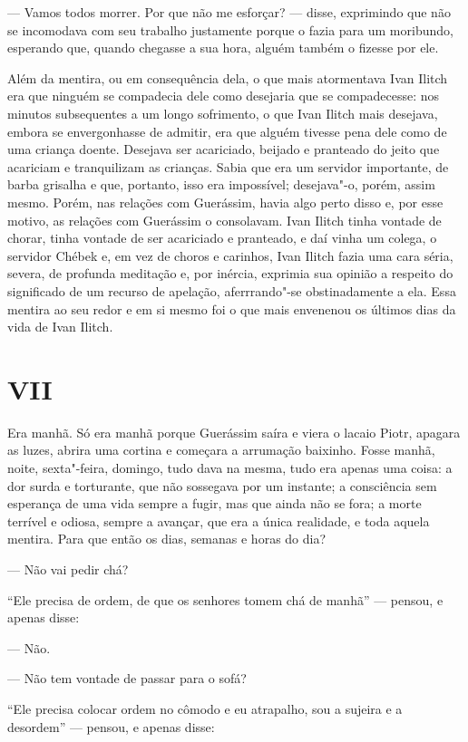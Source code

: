 --- Vamos todos morrer. Por que não me esforçar? --- disse, exprimindo que
não se incomodava com seu trabalho justamente porque o fazia para um
moribundo, esperando que, quando chegasse a sua hora, alguém também o
fizesse por ele.

Além da mentira, ou em consequência dela, o que mais atormentava Ivan
Ilitch era que ninguém se compadecia dele como desejaria que se
compadecesse: nos minutos subsequentes a um longo sofrimento, o que Ivan
Ilitch mais desejava, embora se envergonhasse de admitir, era que alguém
tivesse pena dele como de uma criança doente. Desejava ser acariciado,
beijado e pranteado do jeito que acariciam e tranquilizam as crianças.
Sabia que era um servidor importante, de barba grisalha e que, portanto,
isso era impossível; desejava"-o, porém, assim mesmo. Porém, nas relações
com Guerássim, havia algo perto disso e, por esse motivo, as relações
com Guerássim o consolavam. Ivan Ilitch tinha vontade de chorar, tinha
vontade de ser acariciado e pranteado, e daí vinha um colega, o servidor
Chébek e, em vez de choros e carinhos, Ivan Ilitch fazia uma cara séria,
severa, de profunda meditação e, por inércia, exprimia sua opinião a
respeito do significado de um recurso de apelação, aferrrando"-se
obstinadamente a ela. Essa mentira ao seu redor e em si mesmo foi o que
mais envenenou os últimos dias da vida de Ivan Ilitch.

\section*{VII}

Era manhã. Só era manhã porque Guerássim saíra e viera o lacaio Piotr,
apagara as luzes, abrira uma cortina e começara a arrumação baixinho.
Fosse manhã, noite, sexta"-feira, domingo, tudo dava na mesma, tudo era
apenas uma coisa: a dor surda e torturante, que não sossegava por um
instante; a consciência sem esperança de uma vida sempre a fugir, mas
que ainda não se fora; a morte terrível e odiosa, sempre a avançar, que
era a única realidade, e toda aquela mentira. Para que então os dias,
semanas e horas do dia?

--- Não vai pedir chá?

``Ele precisa de ordem, de que os senhores tomem chá de manhã'' ---
pensou, e apenas disse:

--- Não.

--- Não tem vontade de passar para o sofá?

``Ele precisa colocar ordem no cômodo e eu atrapalho, sou a sujeira e a
desordem'' --- pensou, e apenas disse:

